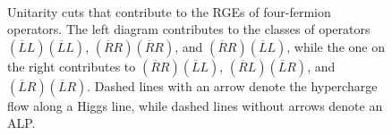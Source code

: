\begin{figure}[h!tb]
\begin{tikzpicture}
	\end{tikzpicture}
	\,
\caption[Unitarity cuts for the renormalization of four-fermion operators]{Unitarity cuts that contribute to the RGEs of four-fermion operators. The left diagram
contributes to the classes of operators $(\overline{L}L)(\overline{L}L)$,
$(\overline{R}R)(\overline{R}R)$, and $(\overline{R}R)(\overline{L}L)$, while the one on the
right contributes to $(\overline{R}R)(\overline{L}L)$, $(\overline{R}L)(\overline{L}R)$, and
$(\overline{L}R)(\overline{L}R)$. Dashed lines with an arrow denote the hypercharge flow along
a Higgs line, while dashed lines without arrows denote an ALP.}
\label{fig:ALPclass4fermions}
\end{figure}

